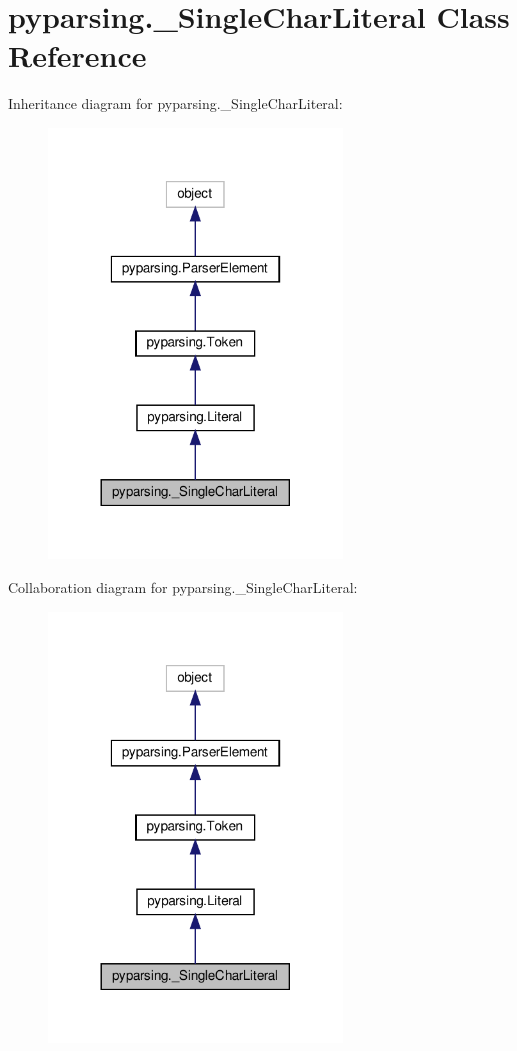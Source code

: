 \hypertarget{classpyparsing_1_1__SingleCharLiteral}{}\section{pyparsing.\+\_\+\+Single\+Char\+Literal Class Reference}
\label{classpyparsing_1_1__SingleCharLiteral}


Inheritance diagram for pyparsing.\+\_\+\+Single\+Char\+Literal\+:
\nopagebreak
\begin{figure}[H]
\begin{center}
\leavevmode
\includegraphics[width=221pt]{classpyparsing_1_1__SingleCharLiteral__inherit__graph}
\end{center}
\end{figure}


Collaboration diagram for pyparsing.\+\_\+\+Single\+Char\+Literal\+:
\nopagebreak
\begin{figure}[H]
\begin{center}
\leavevmode
\includegraphics[width=221pt]{classpyparsing_1_1__SingleCharLiteral__coll__graph}
\end{center}
\end{figure}
